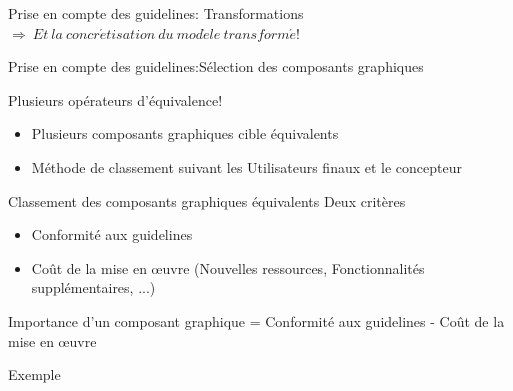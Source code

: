 \documentclass[11pt]{beamer}
\begin{document}
\begin{frame}[t]{{\small Prise en compte des guidelines: Transformations} }
{\scriptsize $\Rightarrow\ Et\ la\ concr\acute{e}tisation\ du\ mod\grave{e}le\ transform\acute{e}!$}



\end{frame}
\begin{frame}[t]{{\small Prise en compte des guidelines:Sélection des composants graphiques }}
\begin{block}{{\scriptsize Plusieurs opérateurs d'équivalence!}}
	\begin{itemize}
		\item {\tiny Plusieurs composants graphiques cible équivalents}
		\item {\tiny Méthode de classement suivant les Utilisateurs finaux et le concepteur}
	\end{itemize}
\end{block}
\pause
\begin{block}{{\scriptsize Classement des composants graphiques équivalents}}
{\scriptsize Deux critères}
\begin{itemize}
	\item {\tiny Conformité aux guidelines }
	\item{\tiny  Coût de la mise en \oe{}uvre (Nouvelles ressources, Fonctionnalités supplémentaires, ...)}

\end{itemize}
 {\scriptsize Importance d'un composant graphique = Conformité aux guidelines - Coût de la mise en \oe{}uvre}
\end{block}
\begin{block}{{\scriptsize Exemple}}
\end{block}

\end{frame}
\end{document}
